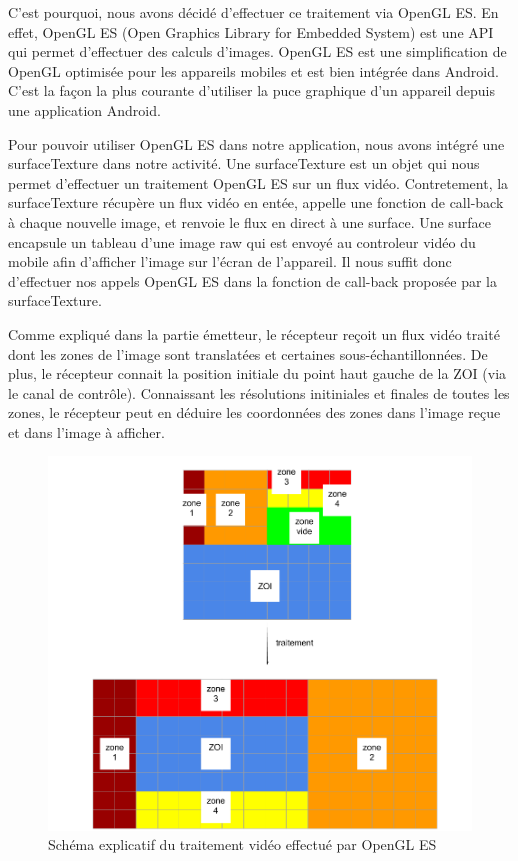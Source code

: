\documentclass[11pt,a4paper]{article}
\begin{document}
\bigbreak
C'est pourquoi, nous avons décidé d'effectuer ce traitement via OpenGL ES.
En effet, OpenGL ES (Open Graphics Library for Embedded System) est une API qui permet d'effectuer des calculs d'images. 
OpenGL ES est une simplification de OpenGL optimisée pour les appareils mobiles et est bien intégrée dans Android.
C'est la façon la plus courante d'utiliser la puce graphique d'un appareil depuis une application Android.

\bigbreak
Pour pouvoir utiliser OpenGL ES dans notre application, nous avons intégré une surfaceTexture dans notre activité.
Une surfaceTexture est un objet qui nous permet d'effectuer un traitement OpenGL ES sur un flux vidéo.
Contretement, la surfaceTexture récupère un flux vidéo en entée, appelle une fonction de call-back à chaque nouvelle image, et renvoie le flux en direct à une surface.
Une surface encapsule un tableau d'une image raw qui est envoyé au controleur vidéo du mobile afin d'afficher l'image sur l'écran de l'appareil.
Il nous suffit donc d'effectuer nos appels OpenGL ES dans la fonction de call-back proposée par la surfaceTexture.

\bigbreak
Comme expliqué dans la partie émetteur, le récepteur reçoit un flux vidéo traité dont les zones de l'image sont translatées et certaines sous-échantillonnées.
De plus, le récepteur connait la position initiale du point haut gauche de la ZOI (via le canal de contrôle).
Connaissant les résolutions initiniales et finales de toutes les zones, le récepteur peut en déduire les coordonnées des zones dans l'image reçue et dans l'image à afficher.

\begin{figure}[H]
\begin{center}
\includegraphics[scale=0.35]{images/schema_traitement_video_retour.png}
\end{center}
\caption{Schéma explicatif du traitement vidéo effectué par OpenGL ES}
\label{}
\end{figure}
\end{document}

